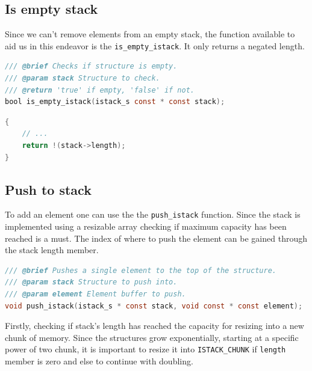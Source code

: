 \subsection{Is empty stack}

Since we can't remove elements from an empty stack, the function available to aid us in this endeavor is the \texttt{is\_empty\_istack}. It only returns a negated length.

\noindent
\begin{minipage}{\linewidth}
\begin{lstlisting}[language=C, style=CodeEditor, label=lst:is-empty-stack, title=include/sequence/istack.h]
/// @brief Checks if structure is empty.
/// @param stack Structure to check.
/// @return 'true' if empty, 'false' if not.
bool is_empty_istack(istack_s const * const stack);
\end{lstlisting}
\end{minipage}

\noindent
\begin{minipage}{\linewidth}
\begin{lstlisting}[language=C, style=CodeEditor, label=lst:is-empty-stack-01, title=source/sequence/istack.c]
{
    // ...
    return !(stack->length);
}
\end{lstlisting}
\end{minipage}

\subsection{Push to stack}

To add an element one can use the the \texttt{push\_istack} function. Since the stack is implemented using a resizable array checking if maximum capacity has been reached is a must. The index of where to push the element can be gained through the stack length member.

\noindent
\begin{minipage}{\linewidth}
\begin{lstlisting}[language=C, style=CodeEditor, label=lst:push-stack, title=include/sequence/istack.h]
/// @brief Pushes a single element to the top of the structure.
/// @param stack Structure to push into.
/// @param element Element buffer to push.
void push_istack(istack_s * const stack, void const * const element);
\end{lstlisting}
\end{minipage}

Firstly, checking if stack's length has reached the capacity for resizing into a new chunk of memory. Since the structures grow exponentially, starting at a specific power of two chunk, it is important to resize it into \texttt{ISTACK\_CHUNK} if \texttt{length} member is zero and else to continue with doubling.

